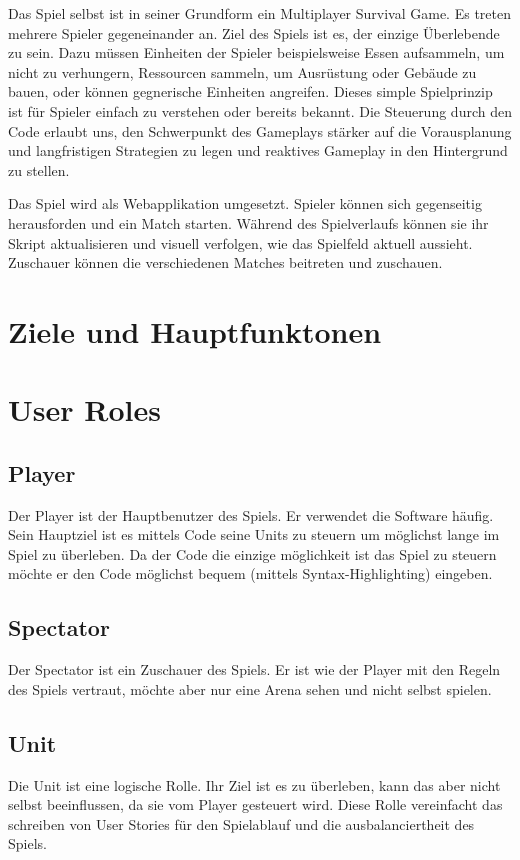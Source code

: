 \documentclass[a4paper, 11pt]{scrartcl}
\let\oldsection\section
\renewcommand\section{\clearpage\oldsection}
\begin{document}
Das Spiel selbst ist in seiner Grundform ein Multiplayer Survival Game. Es treten mehrere Spieler gegeneinander an. Ziel des Spiels ist es, der einzige Überlebende zu sein. Dazu müssen  Einheiten der Spieler beispielsweise Essen aufsammeln, um nicht zu verhungern, Ressourcen sammeln, um Ausrüstung oder Gebäude zu bauen, oder können gegnerische Einheiten angreifen. Dieses simple Spielprinzip ist für Spieler einfach zu verstehen oder bereits bekannt. Die Steuerung durch den Code erlaubt uns, den Schwerpunkt des Gameplays stärker auf die Vorausplanung und langfristigen Strategien zu legen und reaktives Gameplay in den Hintergrund zu stellen.

Das Spiel wird als Webapplikation umgesetzt. Spieler können sich gegenseitig herausforden und ein Match starten. Während des Spielverlaufs können sie ihr Skript aktualisieren und visuell verfolgen, wie das Spielfeld aktuell aussieht. Zuschauer können die verschiedenen Matches beitreten und zuschauen.

\section{Ziele und Hauptfunktonen}

\section{User Roles}
\subsection{Player}
Der Player ist der Hauptbenutzer des Spiels. Er verwendet die Software häufig. Sein Hauptziel ist es mittels Code seine Units zu steuern um möglichst lange im Spiel zu überleben. Da der Code die einzige möglichkeit ist das Spiel zu steuern möchte er den Code möglichst bequem (mittels Syntax-Highlighting) eingeben.
\subsection{Spectator}
Der Spectator ist ein Zuschauer des Spiels. Er ist wie der Player mit den Regeln des Spiels vertraut, möchte aber nur eine Arena sehen und nicht selbst spielen. 
\subsection{Unit}
Die Unit ist eine logische Rolle. Ihr Ziel ist es zu überleben, kann das aber nicht selbst beeinflussen, da sie vom Player gesteuert wird. Diese Rolle vereinfacht das schreiben von User Stories für den Spielablauf und die ausbalanciertheit des Spiels. 
\end{document}
